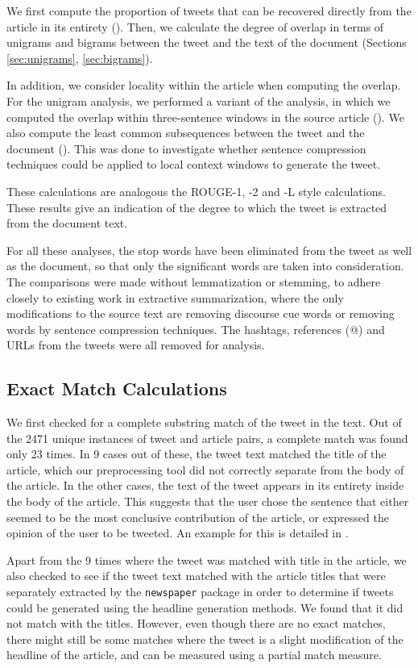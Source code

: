 We first compute the proportion of tweets that can be recovered directly from the article in its entirety (). Then, we calculate the degree of overlap in terms of unigrams and bigrams between the tweet and the text of the document (Sections \ref{sec:unigrams}, \ref{sec:bigrams}). 

In addition, we consider locality within the article when computing the overlap. For the unigram analysis, we performed a variant of the analysis, in which we computed the overlap within three-sentence windows in the source article (). We also compute the least common subsequences between the tweet and the document (). This was done to investigate whether sentence compression techniques could be applied to local context windows to generate the tweet.

These calculations are analogous the ROUGE-1, -2 and -L style calculations. These results give an indication of the degree to which the tweet is extracted from the document text. 

For all these analyses, the stop words have been eliminated from the tweet as well as the document, so that only the significant words are taken into consideration. The comparisons were made without lemmatization or stemming, to adhere closely to existing work in extractive summarization, where the only modifications to the source text are removing discourse cue words or removing words by sentence compression techniques. The hashtags, references (@) and URLs from the tweets were all removed for analysis.

\subsection {Exact Match Calculations}
\label{sec:exact-match}
We first checked for a complete substring match of the tweet in the text. Out of the 2471 unique instances of tweet and article pairs, a complete match was found only 23 times. In 9 cases out of these, the tweet text matched the title of the article, which our preprocessing tool did not correctly separate from the body of the article. In the other cases, the text of the tweet appears in its entirety inside the body of the article. This suggests that the user chose the sentence that either seemed to be the most conclusive contribution of the article, or expressed the opinion of the user to be tweeted. An example for this is detailed in .

Apart from the 9 times where the tweet was matched with title in the article, we also checked to see if the tweet text matched with the article titles that were separately extracted by the \texttt{newspaper} package in order to determine if tweets could be generated using the headline generation methods. We found that it did not match with the titles. However, even though there are no exact matches, there might still be some matches where the tweet is a slight modification of the headline of the article, and can be measured using a partial match measure.

